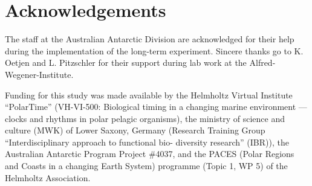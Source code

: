 \section{Acknowledgements}

The staff at the Australian Antarctic Division are acknowledged for their help
during the implementation of the long-term experiment. Sincere thanks go to K.
Oetjen and L. Pitzschler for their support during lab work at the
Alfred-Wegener-Institute.

Funding for this study was made available by the Helmholtz Virtual Institute
“PolarTime” (VH-VI-500: Biological timing in a changing marine environment —
clocks and rhythms in polar pelagic organisms), the ministry of science and
culture (MWK) of Lower Saxony, Germany (Research Training Group
“Interdisciplinary approach to functional bio- diversity research” (IBR)), the
Australian Antarctic Program Project \#4037, and the PACES (Polar Regions and
Coasts in a changing Earth System) programme (Topic 1, WP 5) of the Helmholtz
Association.

\printbibliography[heading=subbibliography]

